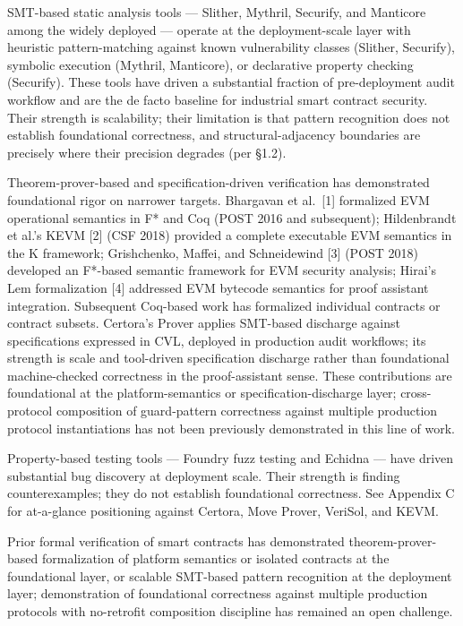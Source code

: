 SMT-based static analysis tools --- Slither, Mythril, Securify, and
Manticore among the widely deployed --- operate at the deployment-scale
layer with heuristic pattern-matching against known vulnerability
classes (Slither, Securify), symbolic execution (Mythril, Manticore), or
declarative property checking (Securify). These tools have driven a
substantial fraction of pre-deployment audit workflow and are the de
facto baseline for industrial smart contract security. Their strength is
scalability; their limitation is that pattern recognition does not
establish foundational correctness, and structural-adjacency boundaries
are precisely where their precision degrades (per §1.2).

Theorem-prover-based and specification-driven verification has
demonstrated foundational rigor on narrower targets. Bhargavan et
al.~{[}1{]} formalized EVM operational semantics in F* and Coq (POST
2016 and subsequent); Hildenbrandt et al.'s KEVM {[}2{]} (CSF 2018)
provided a complete executable EVM semantics in the K framework;
Grishchenko, Maffei, and Schneidewind {[}3{]} (POST 2018) developed an
F*-based semantic framework for EVM security analysis; Hirai's Lem
formalization {[}4{]} addressed EVM bytecode semantics for proof
assistant integration. Subsequent Coq-based work has formalized
individual contracts or contract subsets. Certora's Prover applies
SMT-based discharge against specifications expressed in CVL, deployed in
production audit workflows; its strength is scale and tool-driven
specification discharge rather than foundational machine-checked
correctness in the proof-assistant sense. These contributions are
foundational at the platform-semantics or specification-discharge layer;
cross-protocol composition of guard-pattern correctness against multiple
production protocol instantiations has not been previously demonstrated
in this line of work.

Property-based testing tools --- Foundry fuzz testing and Echidna ---
have driven substantial bug discovery at deployment scale. Their
strength is finding counterexamples; they do not establish foundational
correctness. See Appendix C for at-a-glance positioning against Certora,
Move Prover, VeriSol, and KEVM.

Prior formal verification of smart contracts has demonstrated
theorem-prover-based formalization of platform semantics or isolated
contracts at the foundational layer, or scalable SMT-based pattern
recognition at the deployment layer; demonstration of foundational
correctness against multiple production protocols with no-retrofit
composition discipline has remained an open challenge.

